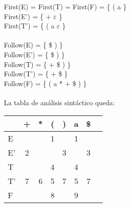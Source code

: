 \documentclass[11pt]{article} %
\begin{document}
First(E) = First(T) = First(F) = \{ ( a \} \\
First(E') = \{ + $\varepsilon$ \} \\
First(T') = \{ ( a $\varepsilon$ \} \\
\\
Follow(E) = \{ \$ ) \} \\
Follow(E') = \{ \$ ) \} \\
Follow(T) = \{ + \$ ) \} \\
Follow(T') = \{ + \$ \} \\
Follow(F) = \{ ( a * + \$ ) \}\\
\\
La tabla de análisis sintáctico queda: \\
\begin{tabular}{l*{6}{c}r}
                  & + & * & ( & ) & a & \$ \\
\hline
E &   &   & 1 &   & 1 &   \\
E' & 2 &   &   & 3 &   & 3 \\
T &   &   & 4 &   & 4 &   \\
T'  & 7 & 6 & 5 & 7 & 5 & 7 \\
F  &   &   & 8 &   & 9 &   \\
\end{tabular}
\end{document}
